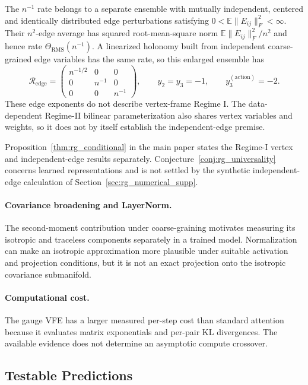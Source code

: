\documentclass[twoside,11pt]{article}
\begin{document}
The $n^{-1}$ rate belongs to a separate ensemble with mutually independent, centered and identically distributed edge perturbations satisfying $0<\mathbb{E}\|E_{ij}\|_F^2<\infty$. Their $n^2$-edge average has squared root-mean-square norm $\mathbb{E}\|E_{ij}\|_F^2/n^2$ and hence rate $\Theta_{\mathrm{RMS}}(n^{-1})$. A linearized holonomy built from independent coarse-grained edge variables has the same rate, so this enlarged ensemble has
\begin{equation}
\mathcal{R}_{\mathrm{edge}}=\begin{pmatrix}n^{-1/2}&0&0\\0&n^{-1}&0\\0&0&n^{-1}\end{pmatrix},
\qquad
y_2=y_3=-1,
\qquad
y_3^{(\mathrm{action})}=-2.
\label{eq:rg_matrix_supp}
\end{equation}
These edge exponents do not describe vertex-frame Regime I. The data-dependent Regime-II bilinear parameterization also shares vertex variables and weights, so it does not by itself establish the independent-edge premise.

Proposition~\ref{thm:rg_conditional} in the main paper states the Regime-I vertex and independent-edge results separately. Conjecture~\ref{conj:rg_universality} concerns learned representations and is not settled by the synthetic independent-edge calculation of Section~\ref{sec:rg_numerical_supp}.

\paragraph{Covariance broadening and LayerNorm.}
The second-moment contribution under coarse-graining motivates measuring its isotropic and traceless components separately in a trained model. Normalization can make an isotropic approximation more plausible under suitable activation and projection conditions, but it is not an exact projection onto the isotropic covariance submanifold.

\paragraph{Computational cost.}
The gauge VFE has a larger measured per-step cost than standard attention because it evaluates matrix exponentials and per-pair KL divergences. The available evidence does not determine an asymptotic compute crossover.

\subsection{Testable Predictions}
\end{document}

